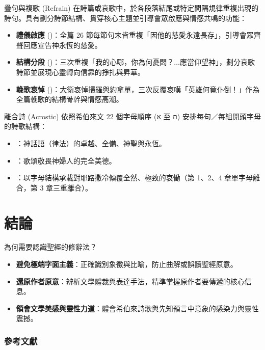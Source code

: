 \documentclass{beamer}
\begin{document}
\begin{frame}{疊句與複歌 (Refrain)}
  在詩篇或哀歌中，於各段落結尾或特定間隔規律重複出現的詩句。具有劃分詩節結構、貫穿核心主題並引導會眾啟應與情感共鳴的功能：
  \begin{itemize}
    \item\textbf{禮儀啟應} ()：全篇 26 節每節句末皆重複「因他的慈愛永遠長存」，引導會眾齊聲回應宣告神永恆的慈愛。
    \item\textbf{結構分段} ()：三次重複「我的心哪，你為何憂悶？$\dots$應當仰望神」，劃分哀歌詩節並展現心靈轉向信靠的掙扎與昇華。\parencite{Psalm4243}
    \item\textbf{輓歌哀悼} ()：\uline{大衛}哀悼\uline{掃羅}與\uline{約拿單}，三次反覆哀嘆「英雄何竟仆倒！」作為全篇輓歌的結構骨幹與情感高潮。
  \end{itemize}
\end{frame}

\begin{frame}{離合詩 (Acrostic)}
  依照希伯來文 22 個字母順序 (\texthebrew{א} 至 \texthebrew{ת}) 安排每句／每組開頭字母的詩歌結構：
  \begin{itemize}
    \item {}：神話語（律法）的卓越、全備、神聖與永恆。
    \item {}：歌頌敬畏神婦人的完全美德。
    \item {}：以字母結構承載對耶路撒冷傾覆全然、極致的哀慟（第 1、2、4 章單字母離合，第 3 章三重離合）。
  \end{itemize}
\end{frame}

\section{結論}

\begin{frame}{為何需要認識聖經的修辭法？}
  \begin{itemize}
    \item \textbf{避免極端字面主義}：正確識別象徵與比喻，防止曲解或誤讀聖經原意。
    \item \textbf{還原作者原意}：辨析文學體裁與表達手法，精準掌握原作者要傳遞的核心信息。
    \item \textbf{領會文學美感與靈性力道}：體會希伯來詩歌與先知預言中意象的感染力與靈性震撼。
  \end{itemize}
\end{frame}

\begin{frame}[allowframebreaks]
  \frametitle{參考文獻}
  \printbibliography
\end{frame}
\end{document}
